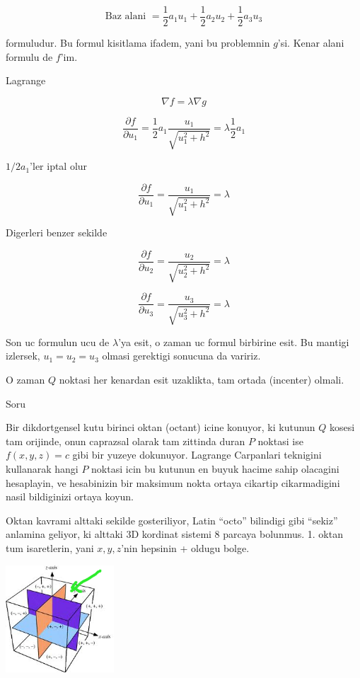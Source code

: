 \documentclass[12pt,fleqn]{article}
\begin{document}
\[ \textrm{Baz alani } = 
\frac{1}{2}a_1u_1 +  
\frac{1}{2}a_2u_2 +  
\frac{1}{2}a_3u_3
\]

formuludur. Bu formul kisitlama ifadem, yani bu problemnin $g$'si. Kenar
alani formulu de $f$'im. 

Lagrange

\[ \nabla f = \lambda \nabla g \]

\[ \frac{\partial f}{\partial u_1} =
\frac{1}{2}a_1 \frac{u_1}{\sqrt{u_1^2 + h^2}} = 
\lambda \frac{1}{2}a_1
\]

$1/2a_1$'ler iptal olur

\[
\frac{\partial f}{\partial u_1} =
\frac{u_1}{\sqrt{u_1^2 + h^2}} = \lambda 
\]

Digerleri benzer sekilde

\[
\frac{\partial f}{\partial u_2} =
\frac{u_2}{\sqrt{u_2^2 + h^2}} = \lambda 
\]

\[
\frac{\partial f}{\partial u_3} =
\frac{u_3}{\sqrt{u_3^2 + h^2}} = \lambda 
\]

Son uc formulun ucu de $\lambda$'ya esit, o zaman uc formul birbirine
esit. Bu mantigi izlersek, $u_1 = u_2 = u_3$ olmasi gerektigi sonucuna da
variriz. 

O zaman $Q$ noktasi her kenardan esit uzaklikta, tam ortada (incenter)
olmali. 

Soru

Bir dikdortgensel kutu birinci oktan (octant) icine konuyor, ki kutunun $Q$
kosesi tam orijinde, onun caprazsal olarak tam zittinda duran $P$ noktasi
ise $f(x,y,z)=c$ gibi bir yuzeye dokunuyor. Lagrange Carpanlari teknigini
kullanarak hangi $P$ noktasi icin bu kutunun en buyuk hacime sahip
olacagini hesaplayin, ve hesabinizin bir maksimum nokta ortaya cikartip
cikarmadigini nasil bildiginizi ortaya koyun. 

Oktan kavrami alttaki sekilde gosteriliyor, Latin ``octo'' bilindigi gibi
``sekiz'' anlamina geliyor, ki alttaki 3D kordinat sistemi 8 parcaya
bolunmus. 1. oktan tum isaretlerin, yani $x,y,z$'nin hepsinin + oldugu
bolge. 

\includegraphics[height=4cm]{octant.png}
\end{document}

